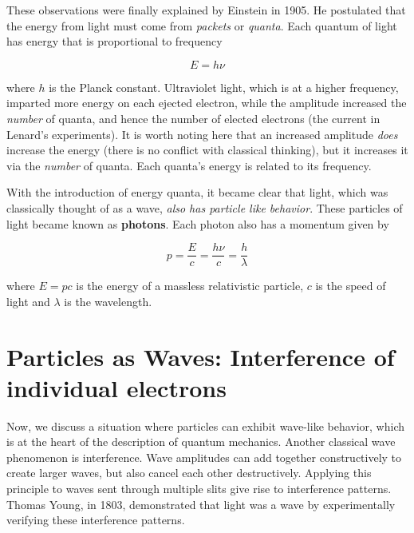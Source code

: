 These observations were finally explained by Einstein in 1905. He postulated that the energy from light must come from \textit{packets} or \textit{quanta}. Each quantum of light has energy that is proportional to frequency 

\begin{equation}
E = h\nu 	
\end{equation}

where $ h $ is the Planck constant. Ultraviolet light, which is at a higher frequency, imparted more energy on each ejected electron, while the amplitude increased the \textit{number} of quanta, and hence the number of elected electrons (the current in Lenard's experiments). It is worth noting here that an increased amplitude \textit{does} increase the energy (there is no conflict with classical thinking), but it increases it via the \textit{number} of quanta. Each quanta's energy is related to its frequency.

With the introduction of energy quanta, it became clear that light, which was classically thought of as a wave, \textit{also has particle like behavior}. These particles of light became known as \textbf{photons}. Each photon also has a momentum given by 

\begin{equation}
	p = \frac{E}{c} = \frac{h\nu}{c} = \frac{h}{\lambda} \label{eq:photon-momentum}
\end{equation}

where $ E = pc $ is the energy of a massless relativistic particle, $c$ is the speed of light and $\lambda$ is the wavelength.

\section{Particles as Waves: Interference of individual electrons}

Now, we discuss a situation where particles can exhibit wave-like behavior, which is at the heart of the description of quantum mechanics. Another classical wave phenomenon is interference. Wave amplitudes can add together constructively to create larger waves, but also cancel each other destructively. Applying this principle to waves sent through multiple slits give rise to interference patterns. Thomas Young, in 1803, demonstrated that light was a wave by experimentally verifying these interference patterns.

